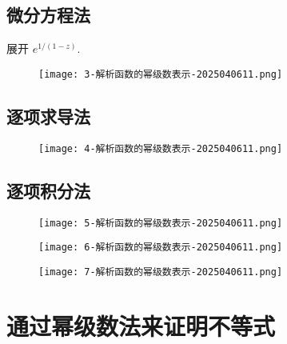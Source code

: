 \subsection{微分方程法}

\begin{exercise}
展开 $e^{ 1/(1-z) }$.
\end{exercise}
\begin{figure}[H]
\centering
\texttt{[image: 3-解析函数的幂级数表示-2025040611.png]}
\label{}
\end{figure}

\subsection{逐项求导法}

\begin{figure}[H]
\centering
\texttt{[image: 4-解析函数的幂级数表示-2025040611.png]}
\label{}
\end{figure}

\subsection{逐项积分法}

\begin{figure}[H]
\centering
\texttt{[image: 5-解析函数的幂级数表示-2025040611.png]}
\label{}
\end{figure}
\begin{figure}[H]
\centering
\texttt{[image: 6-解析函数的幂级数表示-2025040611.png]}
\label{}
\end{figure}

\begin{figure}[H]
\centering
\texttt{[image: 7-解析函数的幂级数表示-2025040611.png]}
\label{}
\end{figure}

\section{通过幂级数法来证明不等式}

